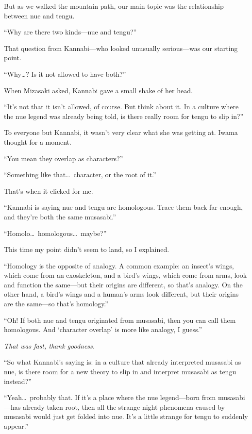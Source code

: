 \documentclass[
    a4paper,
    12pt,
    twoside,
    openany,
    UTF8,
    fontset=windows
]{ctexbook}
\begin{document}
But as we walked the mountain path, our main topic was the relationship between nue and tengu.

``Why are there two kinds---nue and tengu?''

That question from Kannabi---who looked unusually serious---was our starting point.

``Why\dots? Is it not allowed to have both?''

When Mizasaki asked, Kannabi gave a small shake of her head.

``It's not that it isn't allowed, of course. But think about it. In a culture where the nue legend was already being told, is there really room for tengu to slip in?''

To everyone but Kannabi, it wasn't very clear what she was getting at. Iwama thought for a moment.

``You mean they overlap as characters?''

``Something like that\dots\ character, or the root of it.''

That's when it clicked for me.

``Kannabi is saying nue and tengu are homologous. Trace them back far enough, and they're both the same musasabi.''

``Homolo\dots\ homologous\dots\ maybe?''

This time my point didn't seem to land, so I explained.

``Homology is the opposite of analogy. A common example: an insect's wings, which come from an exoskeleton, and a bird's wings, which come from arms, look and function the same---but their origins are different, so that's analogy. On the other hand, a bird's wings and a human's arms look different, but their origins are the same---so that's homology.''

``Oh! If both nue and tengu originated from musasabi, then you can call them homologous. And `character overlap' is more like analogy, I guess.''

\textit{That was fast, thank goodness.}

``So what Kannabi's saying is: in a culture that already interpreted musasabi as nue, is there room for a new theory to slip in and interpret musasabi as tengu instead?''

``Yeah\dots\ probably that. If it's a place where the nue legend---born from musasabi---has already taken root, then all the strange night phenomena caused by musasabi would just get folded into nue. It's a little strange for tengu to suddenly appear.''
\end{document}
